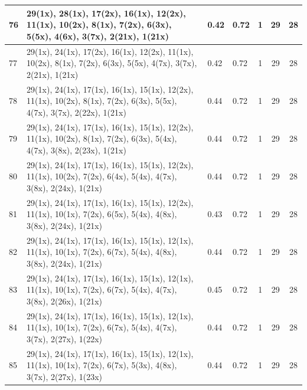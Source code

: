 \begin{small}
\begin{longtable}{|p{0.5cm}|p{9cm}|p{1.3cm}|p{1.3cm}|c|c|c|}
  76 & 29(1x), 28(1x), 17(2x), 16(1x), 12(2x), 11(1x), 10(2x), 8(1x), 7(2x), 6(3x), 5(5x), 4(6x), 3(7x), 2(21x), 1(21x) & \cellcolor{colorGood}  0.42 & \cellcolor{colorGood} 0.72 & 1 & 29 & \cellcolor{colorBad} 28 \\   \hline
  77 & 29(1x), 24(1x), 17(2x), 16(1x), 12(2x), 11(1x), 10(2x), 8(1x), 7(2x), 6(3x), 5(5x), 4(7x), 3(7x), 2(21x), 1(21x) & \cellcolor{colorGood}  0.42 & \cellcolor{colorGood} 0.72 & 1 & 29 & \cellcolor{colorBad} 28 \\   \hline
  78 & 29(1x), 24(1x), 17(1x), 16(1x), 15(1x), 12(2x), 11(1x), 10(2x), 8(1x), 7(2x), 6(3x), 5(5x), 4(7x), 3(7x), 2(22x), 1(21x) & \cellcolor{colorGood}  0.44 & \cellcolor{colorGood} 0.72 & 1 & 29 & \cellcolor{colorBad} 28 \\   \hline
  79 & 29(1x), 24(1x), 17(1x), 16(1x), 15(1x), 12(2x), 11(1x), 10(2x), 8(1x), 7(2x), 6(3x), 5(4x), 4(7x), 3(8x), 2(23x), 1(21x) & \cellcolor{colorGood}  0.44 & \cellcolor{colorGood} 0.72 & 1 & 29 & \cellcolor{colorBad} 28 \\   \hline
  80 & 29(1x), 24(1x), 17(1x), 16(1x), 15(1x), 12(2x), 11(1x), 10(2x), 7(2x), 6(4x), 5(4x), 4(7x), 3(8x), 2(24x), 1(21x) & \cellcolor{colorGood}  0.44 & \cellcolor{colorGood} 0.72 & 1 & 29 & \cellcolor{colorBad} 28 \\   \hline
  81 & 29(1x), 24(1x), 17(1x), 16(1x), 15(1x), 12(2x), 11(1x), 10(1x), 7(2x), 6(5x), 5(4x), 4(8x), 3(8x), 2(24x), 1(21x) & \cellcolor{colorGood}  0.43 & \cellcolor{colorGood} 0.72 & 1 & 29 & \cellcolor{colorBad} 28 \\   \hline
  82 & 29(1x), 24(1x), 17(1x), 16(1x), 15(1x), 12(1x), 11(1x), 10(1x), 7(2x), 6(7x), 5(4x), 4(8x), 3(8x), 2(24x), 1(21x) & \cellcolor{colorGood}  0.44 & \cellcolor{colorGood} 0.72 & 1 & 29 & \cellcolor{colorBad} 28 \\   \hline
  83 & 29(1x), 24(1x), 17(1x), 16(1x), 15(1x), 12(1x), 11(1x), 10(1x), 7(2x), 6(7x), 5(4x), 4(7x), 3(8x), 2(26x), 1(21x) & \cellcolor{colorGood}  0.45 & \cellcolor{colorGood} 0.72 & 1 & 29 & \cellcolor{colorBad} 28 \\   \hline
  84 & 29(1x), 24(1x), 17(1x), 16(1x), 15(1x), 12(1x), 11(1x), 10(1x), 7(2x), 6(7x), 5(4x), 4(7x), 3(7x), 2(27x), 1(22x) & \cellcolor{colorGood}  0.44 & \cellcolor{colorGood} 0.72 & 1 & 29 & \cellcolor{colorBad} 28 \\   \hline
  85 & 29(1x), 24(1x), 17(1x), 16(1x), 15(1x), 12(1x), 11(1x), 10(1x), 7(2x), 6(7x), 5(3x), 4(8x), 3(7x), 2(27x), 1(23x) & \cellcolor{colorGood}  0.44 & \cellcolor{colorGood} 0.72 & 1 & 29 & \cellcolor{colorBad} 28 \\   \hline

\end{longtable}
\end{small}
